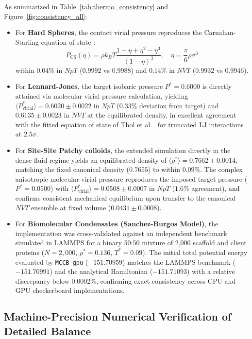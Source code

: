 \documentclass[final,5p,times,twocolumn]{elsarticle}
\begin{document}
As summarized in Table~\ref{tab:thermo_consistency} and
Figure~\ref{fig:consistency_all}: 
\begin{itemize}
    \item For {\bf Hard Spheres}, the contact virial pressure reproduces the Carnahan-Starling equation of state \cite{carnahan1969equation}:
    \begin{equation}
        P_{\text{CS}}(\eta) = \rho k_B T \frac{1 + \eta + \eta^2 - \eta^3}{(1 - \eta)^3}, \quad \eta = \frac{\pi}{6}\rho\sigma^3
    \end{equation}
    within $\mathbf{0.04\%}$ in $NpT$ ($0.9992$ vs $0.9988$) and $\mathbf{0.14\%}$ in $NVT$ ($0.9932$ vs $0.9946$).
    \item For {\bf Lennard-Jones}, the target isobaric pressure $P^* = 0.6000$ is directly attained via molecular virial pressure calculation, yielding $\langle P^*_{\text{virial}} \rangle = 0.6020 \pm 0.0022$ in $NpT$ ($0.33\%$ deviation from target) and $0.6135 \pm 0.0023$ in $NVT$ at the equilibrated density, in excellent agreement with the fitted equation of state of Thol et al.~\cite{Thol2014} for truncated LJ interactions at $2.5\sigma$.
    \item For {\bf Site-Site Patchy colloids}, the extended simulation directly in the dense fluid regime yields an equilibrated density of $\langle \rho^* \rangle = 0.7662 \pm 0.0014$, matching the fixed canonical density ($0.7655$) to within $\mathbf{0.09\%}$. The complex anisotropic molecular virial pressure reproduces the imposed target pressure ($P^*=0.0500$) with $\langle P^*_{\text{virial}} \rangle = 0.0508 \pm 0.0007$ in $NpT$ ($1.6\%$ agreement), and confirms consistent mechanical equilibrium upon transfer to the canonical $NVT$ ensemble at fixed volume ($0.0431 \pm 0.0008$).
    \item For {\bf Biomolecular Condensates (Sanchez-Burgos Model)}, the implementation was cross-validated against an independent benchmark simulated in LAMMPS \cite{thompson2022lammps} for a binary 50:50 mixture of 2,000 scaffold and client proteins ($N = 2{,}000$, $\rho^* = 0.136$, $T^* = 0.09$). The initial total potential energy evaluated by \texttt{MCCB-gpu} ($-151.70959$) matches the LAMMPS benchmark ($-151.70991$) and the analytical Hamiltonian ($-151.71093$) with a relative discrepancy below $0.0002\%$, confirming exact consistency across CPU and GPU checkerboard implementations.
\end{itemize}

\subsection{Machine-Precision Numerical Verification of Detailed Balance}
\label{sec:verif_db}
\end{document}
